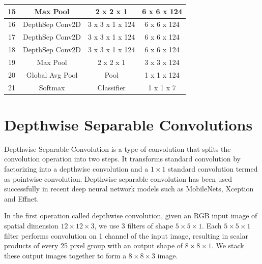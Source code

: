 \documentclass[master]{thesis-uestc}
\begin{document}
\begin{table}[ht]
\begin{center}
\begin{tabular}{|c|c|c|c|}
15 & Max Pool & 2 x 2 x 1 & 6 x 6 x 124\\ \hline

16 & DepthSep Conv2D & 3 x 3 x 1 x 124 & 6 x 6 x 124\\ \hline
17 & DepthSep Conv2D & 3 x 3 x 1 x 124 & 6 x 6 x 124\\ \hline
18 & DepthSep Conv2D & 3 x 3 x 1 x 124 & 6 x 6 x 124\\ \hline

19 & Max Pool & 2 x 2 x 1 & 3 x 3 x 124\\ \hline

20 & Global Avg Pool & Pool & 1 x 1 x 124\\ \hline
21 & Softmax & Classifier & 1 x 1 x 7\\ \hline

\end{tabular}
\end{center}
\end{table}

\section{Depthwise Separable Convolutions}\label{depthconve}
Depthwise Separable Convolution is a type of convolution that splits the convolution operation into two steps. It transforms standard convolution by factorizing into a depthwise convolution and a $1 \times 1$ standard convolution termed as pointwise convolution. Depthwise separable convolution has been used successfully in recent deep neural network models such as MobileNets\cite{DBLP:journals/corr/HowardZCKWWAA17}, Xception\cite{DBLP:journals/corr/Chollet16a} and Effnet\cite{8451339}.

In the first operation called depthwise convolution, given an RGB input image of spatial dimension $12 \times 12 \times 3$, we use 3 filters of shape $5 \times 5\times 1$. Each $5 \times 5\times 1$ filter performs convolution on 1 channel of the input image, resulting in scalar products of every 25 pixel group with an output shape of $8\times8\times1$. We stack these output images together to form a $8\times8\times3$ image.
\end{document}
